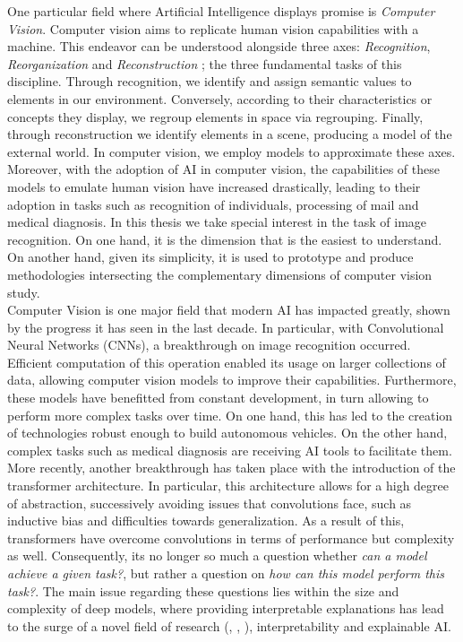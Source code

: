 \noindent One particular field where Artificial Intelligence displays promise is \emph{Computer 
Vision}. Computer vision aims to replicate human vision capabilities with a machine. This endeavor 
can be understood alongside three axes: \emph{Recognition}, \emph{Reorganization} and 
\emph{Reconstruction} \autocite{malik2016three}; the three fundamental tasks of this discipline.
Through recognition, we identify and assign semantic values to elements in our environment. 
Conversely, according to their characteristics or concepts they display, we regroup elements 
in space via regrouping. Finally, through reconstruction we identify elements in a scene, producing 
a model of the external world. In computer vision, we employ models to approximate these axes. 
Moreover, with the adoption of AI in computer vision, the capabilities of these models to emulate 
human vision have increased drastically, leading to their adoption in tasks such as recognition of 
individuals, processing of mail and medical diagnosis. In this thesis we  take special interest in 
the task of image recognition. On one hand, it is the dimension that is the easiest to understand. 
On another hand, given its simplicity, it is used to prototype and produce methodologies 
intersecting the complementary dimensions of computer vision study.\\

\noindent Computer Vision is one major field that modern AI has impacted greatly, shown by the 
progress it has seen in the last decade. In particular, with Convolutional Neural Networks (CNNs), a 
breakthrough on image recognition occurred. Efficient computation of this 
operation enabled its usage on larger collections of data, allowing computer vision models to 
improve their capabilities. Furthermore, these models have benefitted from constant development, in 
turn allowing to perform more complex tasks over time. On one hand, this has led to the creation 
of technologies robust enough to build autonomous vehicles. On the other hand, complex tasks such  
as medical diagnosis are receiving AI tools to facilitate them. More recently, another 
breakthrough has taken place with the introduction of the transformer architecture. 
In particular, this architecture allows for a high degree of abstraction, successively avoiding 
issues that convolutions face, such as inductive bias and difficulties towards generalization. As a 
result of this, transformers have overcome convolutions in terms of performance but complexity as 
well. Consequently, its no longer so much a question whether \textit{can a model achieve a given 
task?}, but rather a question on \textit{how can this model perform this task?}. The main 
issue regarding these questions lies within the size and complexity of deep models, where 
providing interpretable explanations has lead to the surge of a novel field of research 
(\cite{li2018deep}, \cite{guidotti2018survey}, \cite{bodria2021benchmarking}), interpretability 
and explainable AI.\\


